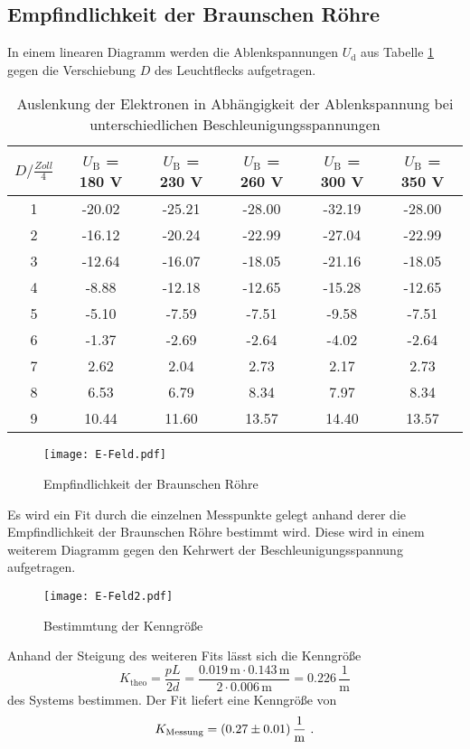 \subsection{Empfindlichkeit der Braunschen Röhre}
In einem linearen Diagramm werden die Ablenkspannungen $U_\text{d}$ aus Tabelle \ref{tab:DIS} gegen die Verschiebung $D$ des Leuchtflecks aufgetragen.
\begin{table}
  \centering
  \begin{tabular}{c| c c c c c }
    \toprule
    $D / \frac{Zoll}{4}$ & $U_\text{B}$ = 180 V & $U_\text{B}$ = 230 V & $U_\text{B}$ = 260 V & $U_\text{B}$ = 300 V & $U_\text{B}$ = 350 V \\
    \midrule
    1 &	-20.02	&-25.21	&-28.00	&-32.19	&-28.00	\\
    2 &	-16.12	&-20.24	&-22.99	&-27.04	&-22.99	\\
    3 &	-12.64	&-16.07	&-18.05	&-21.16	&-18.05	\\
    4 &	-8.88	&-12.18	&-12.65	&-15.28	&-12.65	\\
    5 &	-5.10	&-7.59	&-7.51	&-9.58	&-7.51	\\
    6 &	-1.37	&-2.69	&-2.64	&-4.02	&-2.64	\\
    7 &	2.62	&2.04	&2.73	&2.17	&2.73	\\
    8 &	6.53	&6.79	&8.34	&7.97	&8.34	\\
    9 &	10.44	&11.60	&13.57	&14.40	&13.57	\\
    \bottomrule
  \end{tabular}
  \caption{Auslenkung der Elektronen in Abhängigkeit der Ablenkspannung bei unterschiedlichen Beschleunigungsspannungen}
  \label{tab:DIS}
\end{table}
\begin{figure}
  \centering
  \texttt{[image: E-Feld.pdf]}
  \caption{Empfindlichkeit der Braunschen Röhre}
  \label{fig:empf}
\end{figure}
Es wird ein Fit durch die einzelnen Messpunkte gelegt anhand derer die Empfindlichkeit der Braunschen Röhre bestimmt wird. Diese wird in einem weiterem Diagramm gegen den Kehrwert der Beschleunigungsspannung aufgetragen.
\begin{figure}
  \centering
  \texttt{[image: E-Feld2.pdf]}
  \caption{Bestimmtung der Kenngröße}
  \label{fig:K}
\end{figure}
Anhand der Steigung des weiteren Fits lässt sich die Kenngröße
\begin{equation}
  K_\text{theo} = \frac{p L}{2 d} = \frac{0.019 \, \text{m} \cdot 0.143 \, \text{m}}{2 \cdot 0.006 \, \text{m}} = 0.226 \, \frac{1}{\text{m}}
  \label{eqn:Ktheo}
\end{equation}
des Systems bestimmen. Der Fit liefert eine Kenngröße von
\begin{equation}
  K_\text{Messung} = (\num{0.27 +- 0.01}) \, \frac{1}{\text{m}} \ .
  \label{Kmess}
\end{equation}
